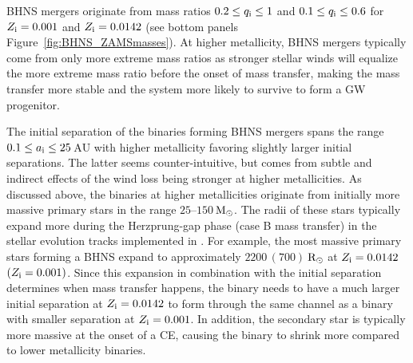 \documentclass[twocolumn]{aastex63}
\newcommand\bhnsSingle{BHNS\xspace}
\newcommand{\ai}{\ensuremath{a_{\rm{i}}}\xspace}
\newcommand{\qi}{\ensuremath{q_{\rm{i}}}\xspace}
\newcommand{\Zi}{\ensuremath{Z_{\rm{i}}}\xspace}
\newcommand{\Rsun}{\ensuremath{\,\rm{R}_{\odot}}\xspace}
\newcommand{\Msun}{\ensuremath{\,\rm{M}_{\odot}}\xspace}
\newcommand{\AU}{\ensuremath{\,\mathrm{AU}}\xspace}
\begin{document}


\bhnsSingle mergers originate from mass ratios $0.2 \leq \qi \leq 1$ and $0.1  \leq \qi  \leq 0.6$ for  $\Zi=0.001$ and $\Zi=0.0142$ (see bottom panels  Figure~\ref{fig:BHNS_ZAMSmasses}).  
At higher metallicity, \bhnsSingle mergers typically come from only more extreme mass ratios as stronger stellar winds will equalize the more extreme mass ratio before the onset of mass transfer, making the mass transfer more stable and the system more likely to survive to form a \ac{GW} progenitor. 

The initial separation of the binaries forming \bhnsSingle mergers spans the range $0.1 \leq \ai   \leq 25$\AU  with higher metallicity favoring slightly larger initial separations.  
The latter seems counter-intuitive, but comes from  subtle and indirect effects of the wind loss being stronger at higher metallicities.
As discussed above, the binaries at higher metallicities originate from initially more massive primary stars in the range $25$--$150$\Msun.  The radii of these stars typically expand more during the Herzprung-gap phase (case B mass transfer) in the stellar evolution tracks implemented in {}. For example, the most massive primary stars forming a \bhnsSingle expand
to approximately $2200\, (700)$\Rsun at $\Zi=0.0142\,$ $(\Zi=0.001)$.%
Since this expansion in combination with the initial separation determines when mass transfer happens, the binary needs to have a much larger initial separation at $\Zi=0.0142$ to form through the same channel as a binary with smaller separation at $\Zi=0.001$.
In addition,  the secondary star is typically more massive at the onset of a \ac{CE}, causing the binary to shrink more compared to lower metallicity binaries. 
\end{document}
